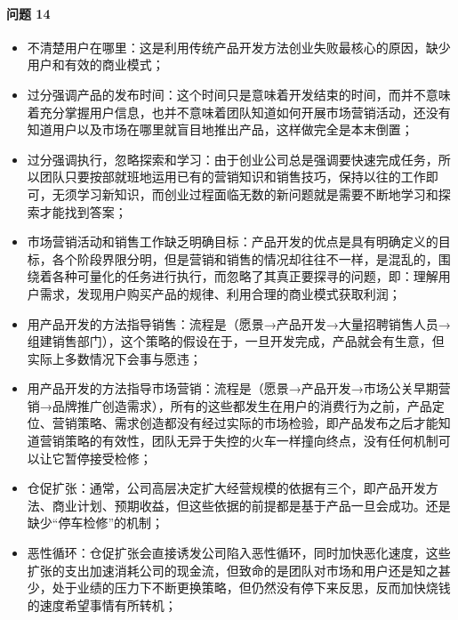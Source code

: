 \documentclass[letterpaper,11pt,english]{sphinxmanual}
\begin{document}
\paragraph{问题 14\sphinxfootnotemark[736]}
\label{\detokenize{chapter_project/Scrum:id1}}%
\begin{footnotetext}[736]\sphinxAtStartFootnote
{}
%
\end{footnotetext}\ignorespaces \begin{itemize}
\item {} 
不清楚用户在哪里：这是利用传统产品开发方法创业失败最核心的原因，缺少用户和有效的商业模式；

\item {} 
过分强调产品的发布时间：这个时间只是意味着开发结束的时间，而并不意味着充分掌握用户信息，也并不意味着团队知道如何开展市场营销活动，还没有知道用户以及市场在哪里就盲目地推出产品，这样做完全是本末倒置；

\item {} 
过分强调执行，忽略探索和学习：由于创业公司总是强调要快速完成任务，所以团队只要按部就班地运用已有的营销知识和销售技巧，保持以往的工作即可，无须学习新知识，而创业过程面临无数的新问题就是需要不断地学习和探索才能找到答案；

\item {} 
市场营销活动和销售工作缺乏明确目标：产品开发的优点是具有明确定义的目标，各个阶段界限分明，但是营销和销售的情况却往往不一样，是混乱的，围绕着各种可量化的任务进行执行，而忽略了其真正要探寻的问题，即：理解用户需求，发现用户购买产品的规律、利用合理的商业模式获取利润；

\item {} 
用产品开发的方法指导销售：流程是（愿景→产品开发→大量招聘销售人员→组建销售部门），这个策略的假设在于，一旦开发完成，产品就会有生意，但实际上多数情况下会事与愿违；

\item {} 
用产品开发的方法指导市场营销：流程是（愿景→产品开发→市场公关早期营销→品牌推广创造需求），所有的这些都发生在用户的消费行为之前，产品定位、营销策略、需求创造都没有经过实际的市场检验，即产品发布之后才能知道营销策略的有效性，团队无异于失控的火车一样撞向终点，没有任何机制可以让它暂停接受检修；

\item {} 
仓促扩张：通常，公司高层决定扩大经营规模的依据有三个，即产品开发方法、商业计划、预期收益，但这些依据的前提都是基于产品一旦会成功。还是缺少“停车检修”的机制；

\item {} 
恶性循环：仓促扩张会直接诱发公司陷入恶性循环，同时加快恶化速度，这些扩张的支出加速消耗公司的现金流，但致命的是团队对市场和用户还是知之甚少，处于业绩的压力下不断更换策略，但仍然没有停下来反思，反而加快烧钱的速度希望事情有所转机；


\end{itemize}
\end{document}
